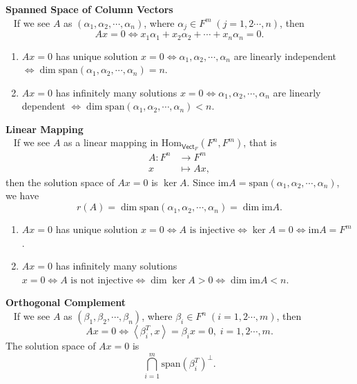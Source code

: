 \documentclass{report}
\theoremstyle{nonumberplain}
\begin{document}
\noindent\textbf{Spanned Space of Column Vectors}\\~
If we see $A$ as $(\alpha_1,\alpha_2,\cdots,\alpha_n)$, where $\alpha_j\in F^m\;(j=1,2\cdots,n)$, then
\[
	Ax=0\iff x_1\alpha_1+x_2\alpha_2+\cdots+x_n\alpha_n=0.
\]
\begin{enumerate}
	\item $Ax=0$ has unique solution $x=0\iff \alpha_1,\alpha_2,\cdots,\alpha_n$ are linearly independent $\iff\dim\mathrm{span}(\alpha_1,\alpha_2,\cdots,\alpha_n)=n$.
	\item $Ax=0$ has infinitely many solutions $x=0\iff \alpha_1,\alpha_2,\cdots,\alpha_n$ are linearly dependent $\iff\dim\mathrm{span}(\alpha_1,\alpha_2,\cdots,\alpha_n)<n$.
\end{enumerate}
\textbf{Linear Mapping}\\~
If we see $A$ as a linear mapping in $\mathrm{Hom}_{\mathsf{Vect}_F}(F^n,F^m)$, that is
\begin{align*}
	A:F^n&\longrightarrow F^m\\
	x&\longmapsto Ax,
\end{align*}
then the solution space of $Ax=0$ is $\ker A$. Since $\mathrm{im} A=\mathrm{span}(\alpha_1,\alpha_2,\cdots,\alpha_n)$, we have
\[
	r(A)=\dim\mathrm{span}(\alpha_1,\alpha_2,\cdots,\alpha_n)=\dim\mathrm{im}A.
\]
\begin{enumerate}
	\item $Ax=0$ has unique solution $x=0\iff A\text{ is injective}\iff\ker A=0\iff \mathrm{im}A=F^m$.
	\item $Ax=0$ has infinitely many solutions $x=0\iff A\text{ is not injective}\iff\dim\ker A>0\iff \dim\mathrm{im}A<n$.
\end{enumerate}

\noindent\textbf{Orthogonal Complement}\\~
If we see $A$ as $(\beta_1,\beta_2,\cdots,\beta_n)$, where $\beta_i\in F^n\;(i=1,2\cdots,m)$, then 
\[
	Ax=0\iff \left\langle\beta_i^T,x\right\rangle=\beta_ix=0,\;i=1,2\cdots,m.
\]
The solution space of $Ax=0$ is
\[
	\bigcap_{i=1}^m\mathrm{span}\left(\beta_i^T\right)^{\perp}.\]
\end{document}

